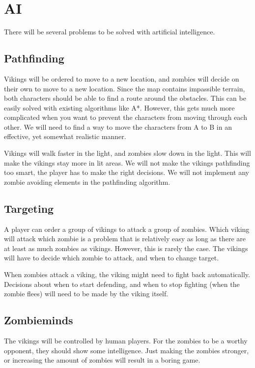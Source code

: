 \chapter{AI}

There will be several problems to be solved with artificial intelligence.

\section{Pathfinding}

Vikings will be ordered to move to a new location, and zombies will decide on their own to move to a new location. Since the map contains impassible terrain, both characters should be able to find a route around the obstacles. This can be easily solved with existing algorithms like A*. However, this gets much more complicated when you want to prevent the characters from moving through each other. We will need to find a way to move the characters from A to B in an effective, yet somewhat realistic manner.

Vikings will walk faster in the light, and zombies slow down in the light. This will make the vikings stay more in lit areas. We will not make the vikings pathfinding too smart, the player has to make the right decisions. We will not implement any zombie avoiding elements in the pathfinding algorithm.

\section{Targeting}

A player can order a group of vikings to attack a group of zombies. Which viking will attack which zombie is a problem that is relatively easy as long as there are at least as much zombies as vikings. However, this is rarely the case. The vikings will have to decide which zombie to attack, and when to change target.

When zombies attack a viking, the viking might need to fight back automatically. Decisions about when to start defending, and when to stop fighting (when the zombie flees) will need to be made by the viking itself.

\section{Zombieminds}

The vikings will be controlled by human players. For the zombies to be a worthy opponent, they should show some intelligence. Just making the zombies stronger, or increasing the amount of zombies will result in a boring game.

